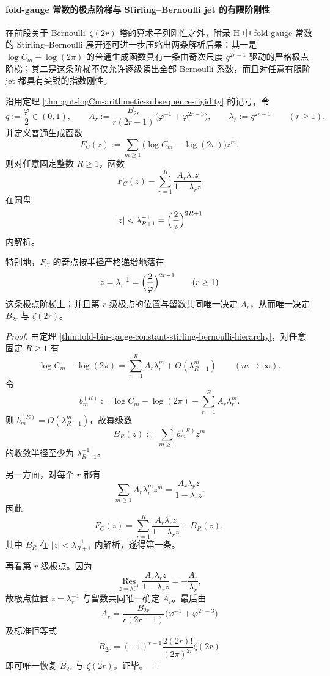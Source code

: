 \paragraph{fold-gauge 常数的极点阶梯与 Stirling--Bernoulli jet 的有限阶刚性}
在前段关于 Bernoulli--\(\zeta(2r)\) 塔的算术子列刚性之外，附录 H 中 fold-gauge 常数的 Stirling--Bernoulli 展开还可进一步压缩出两条解析后果：其一是 \(\log C_m-\log(2\pi)\) 的普通生成函数具有一条由奇次尺度 \(q^{2r-1}\) 驱动的严格极点阶梯；其二是这条阶梯不仅允许逐级读出全部 Bernoulli 系数，而且对任意有限阶 jet 都具有尖锐的指数刚性。

\begin{theorem}\label{thm:gut-logCm-pole-ladder-evenzeta}
沿用定理 \ref{thm:gut-logCm-arithmetic-subsequence-rigidity} 的记号，令
\[
q:=\frac{\varphi}{2}\in(0,1),
\qquad
A_r:=\frac{B_{2r}}{r(2r-1)}\bigl(\varphi^{-1}+\varphi^{2r-3}\bigr),
\qquad
\lambda_r:=q^{2r-1}\qquad(r\ge 1),
\]
并定义普通生成函数
\[
F_C(z):=\sum_{m\ge 1}\bigl(\log C_m-\log(2\pi)\bigr)z^m.
\]
则对任意固定整数 \(R\ge 1\)，函数
\[
\boxed{\;
F_C(z)-\sum_{r=1}^{R}\frac{A_r\lambda_r z}{1-\lambda_r z}\;}
\]
在圆盘
\[
|z|<\lambda_{R+1}^{-1}
=\Bigl(\frac{2}{\varphi}\Bigr)^{2R+1}
\]
内解析。

特别地，\(F_C\) 的奇点按半径严格递增地落在
\[
z=\lambda_r^{-1}=\Bigl(\frac{2}{\varphi}\Bigr)^{2r-1}
\qquad(r\ge 1)
\]
这条极点阶梯上；并且第 \(r\) 级极点的位置与留数共同唯一决定 \(A_r\)，从而唯一决定 \(B_{2r}\) 与 \(\zeta(2r)\)。
\end{theorem}
\begin{proof}
由定理 \ref{thm:fold-bin-gauge-constant-stirling-bernoulli-hierarchy}，对任意固定 \(R\ge 1\) 有
\[
\log C_m-\log(2\pi)
=\sum_{r=1}^{R}A_r\lambda_r^m+O(\lambda_{R+1}^m)
\qquad(m\to\infty).
\]
令
\[
b_m^{(R)}:=
\log C_m-\log(2\pi)-\sum_{r=1}^{R}A_r\lambda_r^m.
\]
则 \(b_m^{(R)}=O(\lambda_{R+1}^m)\)，故幂级数
\[
B_R(z):=\sum_{m\ge 1}b_m^{(R)}z^m
\]
的收敛半径至少为 \(\lambda_{R+1}^{-1}\)。

另一方面，对每个 \(r\) 都有
\[
\sum_{m\ge 1}A_r\lambda_r^m z^m
=\frac{A_r\lambda_r z}{1-\lambda_r z}.
\]
因此
\[
F_C(z)=\sum_{r=1}^{R}\frac{A_r\lambda_r z}{1-\lambda_r z}+B_R(z),
\]
其中 \(B_R\) 在 \(|z|<\lambda_{R+1}^{-1}\) 内解析，遂得第一条。

再看第 \(r\) 级极点。因为
\[
\operatorname*{Res}_{z=\lambda_r^{-1}}
\frac{A_r\lambda_r z}{1-\lambda_r z}
=-\frac{A_r}{\lambda_r},
\]
故极点位置 \(z=\lambda_r^{-1}\) 与留数共同唯一确定 \(A_r\)。最后由
\[
A_r=\frac{B_{2r}}{r(2r-1)}\bigl(\varphi^{-1}+\varphi^{2r-3}\bigr)
\]
及标准恒等式
\[
B_{2r}=(-1)^{r-1}\frac{2(2r)!}{(2\pi)^{2r}}\zeta(2r)
\]
即可唯一恢复 \(B_{2r}\) 与 \(\zeta(2r)\)。证毕。
\end{proof}

